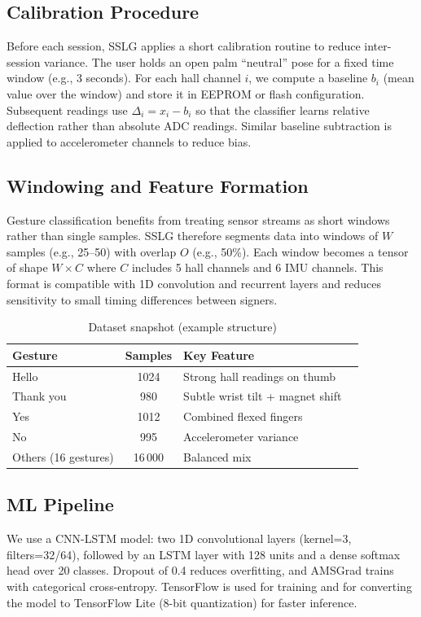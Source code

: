 \documentclass[conference]{IEEEtran}
\begin{document}
\subsection{Calibration Procedure}
Before each session, SSLG applies a short calibration routine to reduce inter-session variance. The user holds an open palm ``neutral'' pose for a fixed time window (e.g., 3 seconds). For each hall channel $i$, we compute a baseline $b_i$ (mean value over the window) and store it in EEPROM or flash configuration. Subsequent readings use $\Delta_i = x_i - b_i$ so that the classifier learns relative deflection rather than absolute ADC readings. Similar baseline subtraction is applied to accelerometer channels to reduce bias.

\subsection{Windowing and Feature Formation}
Gesture classification benefits from treating sensor streams as short windows rather than single samples. SSLG therefore segments data into windows of $W$ samples (e.g., 25--50) with overlap $O$ (e.g., 50\%). Each window becomes a tensor of shape $W \times C$ where $C$ includes 5 hall channels and 6 IMU channels. This format is compatible with 1D convolution and recurrent layers and reduces sensitivity to small timing differences between signers.

\begin{table}[htbp]
    \centering
    \caption{Dataset snapshot (example structure)}
    \begin{tabularx}{\columnwidth}{@{}lclX@{}}
        \toprule
        Gesture & Samples & Key Feature \\
        \midrule
        Hello & 1024 & Strong hall readings on thumb \\
        Thank you & 980 & Subtle wrist tilt + magnet shift \\
        Yes & 1012 & Combined flexed fingers \\
        No & 995 & Accelerometer variance \\
        Others (16 gestures) & 16\,000 & Balanced mix \\
        \bottomrule
    \end{tabularx}
    \label{tab:dataset}
\end{table}

\subsection{ML Pipeline}
We use a CNN-LSTM model: two 1D convolutional layers (kernel=3, filters=32/64), followed by an LSTM layer with 128 units and a dense softmax head over 20 classes. Dropout of 0.4 reduces overfitting, and AMSGrad trains with categorical cross-entropy. TensorFlow is used for training and for converting the model to TensorFlow Lite (8-bit quantization) for faster inference\cite{tensorflow}.
\end{document}

